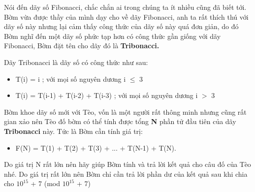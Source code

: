 Nói đến dãy số Fibonacci, chắc chắn ai trong chúng ta ít nhiều cũng đã biết tới. Bờm vừa được thầy của mình dạy cho về dãy Fibonacci, anh ta rất thích thú với dãy số này nhưng lại cảm thấy công thức của dãy số này quá đơn giản, do đó Bờm nghĩ đến một dãy số phức tạp hơn có công thức gần giống với dãy Fibonacci, Bờm đặt tên cho dãy đó là \textbf{ Tribonacci. }

Dãy Tribonacci là dãy số có công thức như sau:
\begin{itemize}
	\item T(i) = i ; với mọi số nguyên dương i  $\le$  3
	\item T(i) = T(i-1) + T(i-2) + T(i-3) ; với mọi số nguyên dương i $>$ 3
\end{itemize}

Bờm khoe dãy số mới với Tèo, vốn là một người rất thông minh nhưng cũng rất gian xảo nên Tèo đố bờm có thể tính được tổng \textbf{ N } phần tử đầu tiên của dãy \textbf{ Tribonacci } này. Tức là Bờm cần tính giá trị:
\begin{itemize}
	\item F(N) = T(1) + T(2) + T(3) + ... + T(N-1) + T(N).
\end{itemize}

Do giá trị N rất lớn nên hãy giúp Bờm tính và trả lời kết quả cho câu đố của Tèo nhé. Do giá trị rất lớn nên Bờm chỉ cần trả lời phần dư của kết quả sau khi chia cho $10^{15}$ + 7 (mod $10^{15}$ + 7)